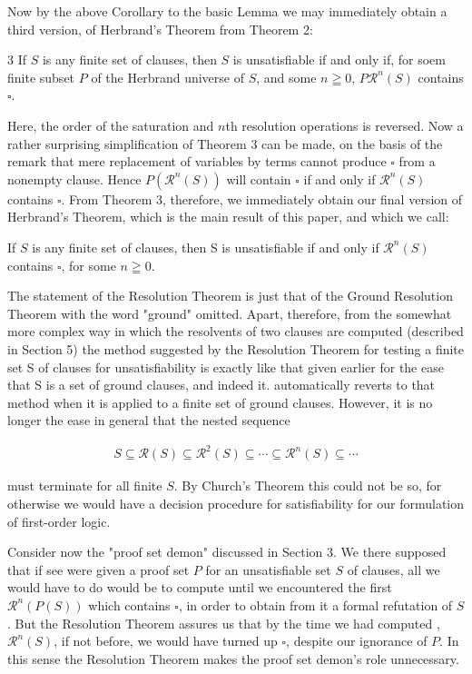 \documentclass[8pt]{extarticle}
\begin{document}
Now by the above Corollary to the basic Lemma we may immediately obtain
a third version, of Herbrand's Theorem from Theorem 2: 

\begin{pg8theorem3}{3}\label{pg8theorem3}
If $S$ is any finite set of clauses, then $S$ is unsatisfiable if and only if, for soem finite subset $P$ of the Herbrand universe of $S$, and some $n\geqq 0$, $P\mathcal{R}^n(S)$ contains $\square$.
\end{pg8theorem3}

Here, the order of the saturation and $n$th resolution operations is reversed.
Now a rather surprising simplification of Theorem 3 can be made, on the basis
of the remark that mere replacement of variables by terms cannot produce $\square$
from a nonempty clause. Hence $P(\mathcal{R}^n(S))$ will contain $\square$ if and only if $\mathcal{R}^n(S)$ contains $\square$. From Theorem 3, therefore, we immediately obtain our final version of Herbrand's Theorem, which is the main result of this paper, and which we call:


\begin{pg8rt}
If $S$ is any finite set of clauses, then S is unsatisfiable
if and only if $\mathcal{R}^n(S)$ contains $\square$, for some $n\geqq 0$. 
\end{pg8rt}

The statement of the Resolution Theorem is just that of the Ground Resolution Theorem with the word "ground" omitted. Apart, therefore, from the somewhat more complex way in which the resolvents of two clauses are computed
(described in Section 5) the method suggested by the Resolution Theorem for
testing a finite set S of clauses for unsatisfiability is exactly like that given earlier for the ease that S is a set of ground clauses, and indeed it. automatically reverts to that method when it is applied to a finite set of ground clauses. However, it is no longer the ease in general that the nested sequence

\begin{align*}
    S \subseteq \mathcal{R}(S) \subseteq \mathcal{R}^2(S) \subseteq \dotsm \subseteq \mathcal{R}^n(S) \subseteq \dotsm
\end{align*}

must terminate for all finite $S$. By Church's Theorem this could not be so, for otherwise we would have a decision procedure for satisfiability for our formulation of first-order logic. 

Consider now the "proof set demon" discussed in Section 3. We there supposed that if see were given a proof set $P$ for an unsatisfiable set $S$ of clauses, all we would have to do would be to compute until we encountered the first $\mathcal{R}^n(P(S))$ which contains $\square$, in order to obtain from it a formal refutation of $S$. But the Resolution Theorem assures us that by the time we had computed ,$\mathcal{R}^n(S)$, if not before, we would have turned up $\square$, despite our ignorance of $P$. In this sense the Resolution Theorem makes the proof set demon's role unnecessary.
\end{document}
